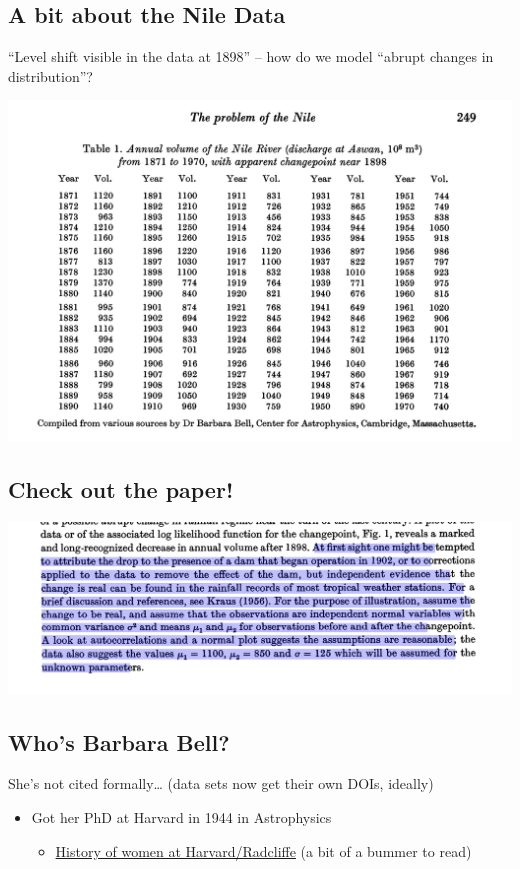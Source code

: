 \documentclass[
  letterpaper,
  DIV=11,
  numbers=noendperiod]{scrartcl}
\providecommand{\tightlist}{%
  \setlength{\itemsep}{0pt}\setlength{\parskip}{0pt}}\usepackage{longtable,booktabs,array}
\begin{document}
\subsection{A bit about the Nile
Data}\label{a-bit-about-the-nile-data-1}

``Level shift visible in the data at 1898'' -- how do we model ``abrupt
changes in distribution''?

\includegraphics{images/table.png}

\subsection{Check out the paper!}\label{check-out-the-paper}

\includegraphics{images/early_time_series.png}

\subsection{Who's Barbara Bell?}\label{whos-barbara-bell}

She's not cited formally\ldots{} (data sets now get their own DOIs,
ideally)

\begin{itemize}
\item
  Got her PhD at Harvard in 1944 in Astrophysics

  \begin{itemize}
  \tightlist
  \item
    \href{https://www.radcliffe.harvard.edu/event/2012-its-complicated-exhibition\#:~:text=Mary\%20Whiton\%20Calkins\%20(Smith\%20AB,1886\%2C\%201890\%E2\%80\%931891).}{History
    of women at Harvard/Radcliffe} (a bit of a bummer to read)
  \end{itemize}
\end{itemize}
\end{document}
